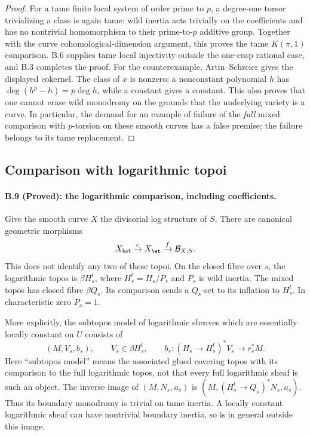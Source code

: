 \begin{proof}
For a tame finite local system of order prime to $p$, a
degree-one torsor trivializing a class is again tame: wild
inertia acts trivially on the coefficients and has no nontrivial
homomorphism to their prime-to-$p$ additive group. Together with
the curve cohomological-dimension argument, this proves the
tame $K(\pi,1)$ comparison. B.6 supplies tame local injectivity
outside the one-cusp rational case, and B.3 completes the proof.
For the counterexample, Artin--Schreier gives the displayed
cokernel. The class of $x$ is nonzero: a nonconstant polynomial
$h$ has $\deg(h^p-h)=p\deg h$, while a constant gives a constant.
This also proves that one cannot erase wild monodromy on the
grounds that the underlying variety is a curve. In particular,
the demand for an example of failure of the \emph{full} mixed
comparison with $p$-torsion on these smooth curves has a false
premise; the failure belongs to its tame replacement.
\end{proof}

\subsection{Comparison with logarithmic topoi}

\paragraph{B.9 (Proved): the logarithmic comparison, including coefficients.}\label{B9}
Give the smooth curve $X$ the divisorial log structure of $S$.
There are canonical geometric morphisms
\[
 X_{\mathrm{ket}}\xrightarrow{\epsilon}X_{\et}
       \xrightarrow{f}\mathcal B_{X;S}.
\]
This does not identify any two of these topoi. On the closed
fibre over $s$, the logarithmic topos is $\beta H_s^t$, where
$H_s^t=H_s/P_s$ and $P_s$ is wild inertia. The mixed topos has
closed fibre $\beta Q_s$. Its comparison sends a $Q_s$-set to
its inflation to $H_s^t$. In characteristic zero $P_s=1$.

More explicitly, the subtopos model of logarithmic sheaves
which are essentially locally constant on $U$ consists of
\[
 (M,V_s,b_s),\qquad
 V_s\in\beta H_s^t,\qquad
 b_s:(H_s\to H_s^t)^*V_s\longrightarrow r_s^*M.
\]
Here ``subtopos model'' means the associated glued covering
topos with its comparison to the full logarithmic topos, not
that every full logarithmic sheaf is such an object.
The inverse image of $(M,N_s,a_s)$ is
$(M,(H_s^t\to Q_s)^*N_s,a_s)$. Thus its boundary monodromy
is trivial on tame inertia. A locally constant logarithmic
sheaf can have nontrivial boundary inertia, so is in general
outside this image.

